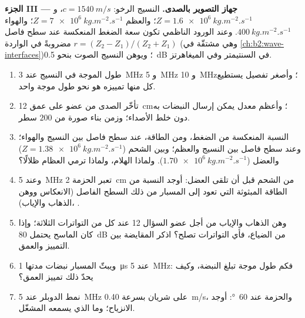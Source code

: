 \begin{problem}
\medskip
\noindent\textbf{الجزء III --- جهاز التصوير بالصدى.}
النسيج الرخو: $c = \qty{1540}{m/s}$، و $Z = \qty{1.6e6}{kg.m^{-2}.s^{-1}}$؛ والعظم
$Z = \qty{7e6}{kg.m^{-2}.s^{-1}}$؛ والهواء $\qty{400}{kg.m^{-2}.s^{-1}}$. وعند الورود
الناظمي تكون سعة الضغط المنعكسة عند سطح فاصل $r = (Z_2 -
Z_1)/(Z_2 + Z_1)$ مضروبةً في الواردة (وهي مشتقّة في
\cref{ch:b2:wave-interfaces})؛ ويوهن النسيج الصوت بنحو
\qty{0.5}{dB} في السنتيمتر وفي الميغاهرتز.
\begin{enumerate}[resume]
  \item طول الموجة في النسيج عند \qty{3}{MHz} و \qty{5}{MHz} و \qty{10}{MHz}؛
        وأصغر تفصيل يستطيع كل منها تمييزه هو نحو طول موجة واحد.
  \item تأخّر الصدى من عضو على عمق \qty{12}{cm}؛ وأعظم معدل يمكن
        إرسال النبضات به دون خلط الأصداء؛ وزمن بناء
        صورة من $200$ سطر.
  \item النسبة المنعكسة من الضغط، ومن الطاقة، عند سطح فاصل بين
        النسيج والهواء؛ وعند سطح فاصل بين النسيج والعظم؛ وبين الشحم
        ($Z = \qty{1.38e6}{kg.m^{-2}.s^{-1}}$) والعضل
        ($\qty{1.70e6}{kg.m^{-2}.s^{-1}}$). ولماذا الهلام، ولماذا ترمي العظام
        ظلالًا؟
  \item وعند \qty{5}{MHz} تعبر الحزمة \qty{2}{cm} من الشحم قبل أن تلقى
        العضل: أوجد النسبة من الطاقة المبثوثة التي تعود إلى
        المسبار من ذلك السطح الفاصل (الانعكاس ووهن الذهاب
        والإياب)، .
  \item وهن الذهاب والإياب  من أجل عضو السؤال 12
        عند كل من التواترات الثلاثة؛ وإذا كان الماسح يحتمل
        \qty{80}{dB} من الضياع، فأي التواترات تصلح؟ اذكر المقايضة
        بين التمييز والعمق.
  \item ويبثّ المسبار نبضات مدتها \qty{1}{\micro s} عند \qty{5}{MHz}: فكم طول
        موجة تبلغ النبضة، وكيف يحدّ ذلك تمييز العمق؟
  \item نمط الدوبلر عند \qty{5}{MHz} على شريان بسرعة \qty{0.40}{m/s}، والحزمة عند
        \qty{60}{\degree}: أوجد الانزياح؛ وما الذي يسمعه المشغّل.
\end{enumerate}


\end{problem}
